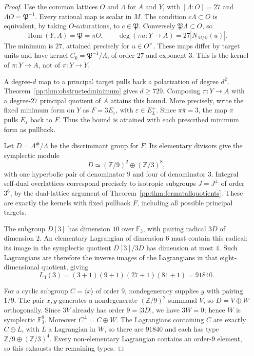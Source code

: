\begin{proof}
Use the common lattices $O$ and $\Lambda$ for $A$ and $Y$, with
$[\Lambda:O]=27$ and $\Lambda O=\mathfrak P^{-1}$.
Every rational map is scalar in $M$. The condition $c\Lambda\subset O$
is equivalent, by taking $O$-saturations, to $c\in\mathfrak P$.
Conversely $\mathfrak P\Lambda\subset O$, so
\[
 \operatorname{Hom}(Y,A)=\mathfrak P=\pi O,\qquad
 \deg(\pi u:Y\to A)=27|N_{M/\mathbb Q}(u)|.
\]
The minimum is $27$, attained precisely for $u\in O^\times$.
These maps differ by target units and have kernel
$C_0=\mathfrak P^{-1}/\Lambda$, of order $27$ and exponent $3$.
This is the kernel of $\pi:Y\to A$, not of $\pi:Y\to Y$.

A degree-$d$ map to a principal target pulls back a polarization
of degree $d^2$. Theorem~\ref{pp:thm:obstructedminimum} gives
$d\ge729$. Composing $\pi:Y\to A$ with a degree-$27$ principal
quotient of $A$ attains this bound. More precisely, write the fixed
minimum form on $Y$ as $F=3E_\varepsilon$, with
$\varepsilon\in E_L^+$. Since $\pi\bar\pi=3$, the map $\pi$
pulls $E_\varepsilon$ back to $F$. Thus the bound is attained with
each prescribed minimum form as pullback.

Let $D=\Lambda^\#/\Lambda$ be the discriminant group for $F$.
Its elementary divisors give the symplectic module
\[
 D\simeq(\mathbb Z/9)^2\oplus(\mathbb Z/3)^8,
\]
with one hyperbolic pair of denominator $9$ and four of denominator
$3$. Integral self-dual overlattices correspond precisely to isotropic
subgroups $J=J^\perp$ of order $3^6$, by the dual-lattice argument of
Theorem~\ref{pp:thm:fermatallquotients}. These are exactly the kernels
with fixed pullback $F$, including all possible principal targets.

The subgroup $D[3]$ has dimension $10$ over $\mathbb F_3$, with
pairing radical $3D$ of dimension $2$. An elementary Lagrangian of
dimension $6$ must contain this radical: its image in the symplectic
quotient $D[3]/3D$ has dimension at most $4$. Such Lagrangians are
therefore the inverse images of the Lagrangians in that eight-dimensional
quotient, giving
\[
 L_4(3)=(3+1)(9+1)(27+1)(81+1)=91840.
\]

For a cyclic subgroup $C=\langle x\rangle$ of order $9$,
nondegeneracy supplies $y$ with pairing $1/9$. The pair $x,y$
generates a nondegenerate $(\mathbb Z/9)^2$ summand $V$, so
$D=V\oplus W$ orthogonally. Since $3V$ already has order $9=|3D|$,
we have $3W=0$; hence $W$ is symplectic $\mathbb F_3^8$.
Moreover $C^\perp=C\oplus W$. The Lagrangians containing $C$
are exactly $C\oplus L$, with $L$ a Lagrangian in $W$, so there
are $91840$ and each has type $\mathbb Z/9\oplus(\mathbb Z/3)^4$.
Every non-elementary Lagrangian contains an order-$9$ element,
so this exhausts the remaining types.


\end{proof}
